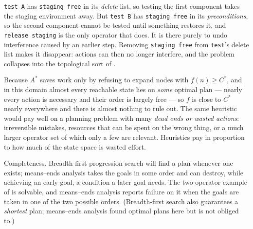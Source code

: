 \begin{ans}
  \item \texttt{test A} has \texttt{staging free} in its \emph{delete} list, so
        testing the first component takes the staging environment away. But
        \texttt{test B} has \texttt{staging free} in its \emph{preconditions}, so
        the second component cannot be tested until something restores it, and
        \texttt{release staging} is the only operator that does. It is there purely
        to undo interference caused by an earlier step. Removing
        \texttt{staging free} from \texttt{test}'s delete list makes it disappear:
        actions can then no longer interfere, and the problem collapses into the
        topological sort of .
  \item Because $A^{*}$ saves work only by refusing to expand nodes with
        $f(n) \ge C^{*}$, and in this domain almost every reachable state lies on
        \emph{some} optimal plan --- nearly every action is necessary and their
        order is largely free --- so $f$ is close to $C^{*}$ nearly everywhere and
        there is almost nothing to rule out. The same heuristic would pay well on a
        planning problem with many \emph{dead ends or wasted actions}: irreversible
        mistakes, resources that can be spent on the wrong thing, or a much larger
        operator set of which only a few are relevant. Heuristics pay in proportion
        to how much of the state space is wasted effort.
  \item Completeness. Breadth-first progression search will find a plan whenever one
        exists; means--ends analysis takes the goals in some order and can destroy,
        while achieving an early goal, a condition a later goal needs. The two-operator
        example of  is solvable, and means--ends analysis reports
        failure on it when the goals are taken in one of the two possible orders.
        (Breadth-first search also guarantees a \emph{shortest} plan; means--ends
        analysis found optimal plans here but is not obliged to.)
\end{ans}

